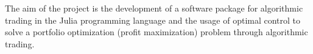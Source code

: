 The aim of the project is the development of a software package for algorithmic trading in the Julia programming language and the usage of optimal control to solve a portfolio optimization (profit maximization) problem through algorithmic trading.


